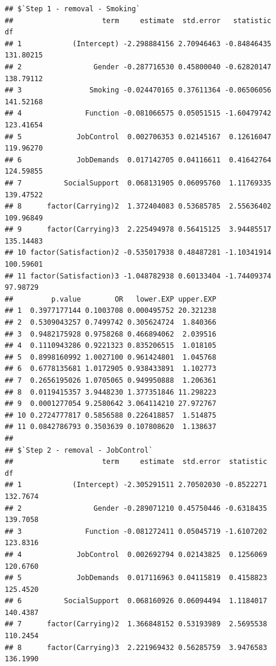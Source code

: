 \documentclass[
]{book}
\newenvironment{Shaded}{\begin{snugshade}}{\end{snugshade}}
\newcommand{\NormalTok}[1]{#1}
\newcommand{\OperatorTok}[1]{\textcolor[rgb]{0.81,0.36,0.00}{\textbf{#1}}}
\begin{document}
\begin{Shaded}
\end{Shaded}

\begin{verbatim}
## $`Step 1 - removal - Smoking`
##                     term     estimate  std.error   statistic        df
## 1            (Intercept) -2.298884156 2.70946463 -0.84846435 131.80215
## 2                 Gender -0.287716530 0.45800040 -0.62820147 138.79112
## 3                Smoking -0.024470165 0.37611364 -0.06506056 141.52168
## 4               Function -0.081066575 0.05051515 -1.60479742 123.41654
## 5             JobControl  0.002706353 0.02145167  0.12616047 119.96270
## 6             JobDemands  0.017142705 0.04116611  0.41642764 124.59855
## 7          SocialSupport  0.068131905 0.06095760  1.11769335 139.47522
## 8      factor(Carrying)2  1.372404083 0.53685785  2.55636402 109.96849
## 9      factor(Carrying)3  2.225494978 0.56415125  3.94485517 135.14483
## 10 factor(Satisfaction)2 -0.535017938 0.48487281 -1.10341914 100.59601
## 11 factor(Satisfaction)3 -1.048782938 0.60133404 -1.74409374  97.98729
##         p.value        OR   lower.EXP upper.EXP
## 1  0.3977177144 0.1003708 0.000495752 20.321238
## 2  0.5309043257 0.7499742 0.305624724  1.840366
## 3  0.9482175928 0.9758268 0.466894062  2.039516
## 4  0.1110943286 0.9221323 0.835206515  1.018105
## 5  0.8998160992 1.0027100 0.961424801  1.045768
## 6  0.6778135681 1.0172905 0.938433891  1.102773
## 7  0.2656195026 1.0705065 0.949950888  1.206361
## 8  0.0119415357 3.9448230 1.377351846 11.298223
## 9  0.0001277054 9.2580642 3.064114210 27.972767
## 10 0.2724777817 0.5856588 0.226418857  1.514875
## 11 0.0842786793 0.3503639 0.107808620  1.138637
## 
## $`Step 2 - removal - JobControl`
##                     term     estimate  std.error  statistic       df
## 1            (Intercept) -2.305291511 2.70502030 -0.8522271 132.7674
## 2                 Gender -0.289071210 0.45750446 -0.6318435 139.7058
## 3               Function -0.081272411 0.05045719 -1.6107202 123.8316
## 4             JobControl  0.002692794 0.02143825  0.1256069 120.6760
## 5             JobDemands  0.017116963 0.04115819  0.4158823 125.4520
## 6          SocialSupport  0.068160926 0.06094494  1.1184017 140.4387
## 7      factor(Carrying)2  1.366848152 0.53193989  2.5695538 110.2454
## 8      factor(Carrying)3  2.221969432 0.56285759  3.9476583 136.1990

\end{verbatim}
\end{document}
